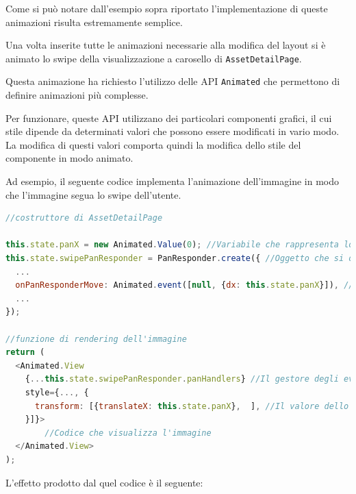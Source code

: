 Come si può notare dall'esempio sopra riportato l'implementazione di queste animazioni risulta estremamente semplice.

Una volta inserite tutte le animazioni necessarie alla modifica del layout si è animato lo swipe della visualizzazione a carosello di \texttt{AssetDetailPage}.

Questa animazione ha richiesto l'utilizzo delle API \texttt{Animated} che permettono di definire animazioni più complesse.

Per funzionare, queste API utilizzano dei particolari componenti grafici, il cui stile dipende da determinati valori che possono essere modificati in vario modo. La modifica di questi valori comporta quindi la modifica dello stile del componente in modo animato.

Ad esempio, il seguente codice implementa l'animazione dell'immagine in modo che l'immagine segua lo swipe dell'utente.

\begin{lstlisting}[language=JavaScript, caption=AssetDetailImage - Spostamento dell'immagine allo swipe delll'utente]
//costruttore di AssetDetailPage

this.state.panX = new Animated.Value(0); //Variabile che rappresenta lo spostamento dell'immagine
this.state.swipePanResponder = PanResponder.create({ //Oggetto che si occupa di rilevare le gesture dell'utente
  ...
  onPanResponderMove: Animated.event([null, {dx: this.state.panX}]), //All'evento onPanResponderMove, che viene sollevato quando l'utente esegue un pan (equivalente del drag'n'drop nei dispositivi touchscreen) viene collegata la variabile panX, in modo che il valore della variabile venga modificato e che la modifica venga effettuata in modo animato
  ...
});

//funzione di rendering dell'immagine
return (
  <Animated.View
    {...this.state.swipePanResponder.panHandlers} //Il gestore degli eventi viene collegato alla View
    style={..., {
      transform: [{translateX: this.state.panX},  ], //Il valore dello spostamento viene associato allo stile della View, in particolare alla traslazione sull'asse X
    }]}>
    	//Codice che visualizza l'immagine
  </Animated.View>
);
\end{lstlisting}

L'effetto prodotto dal quel codice è il seguente:

